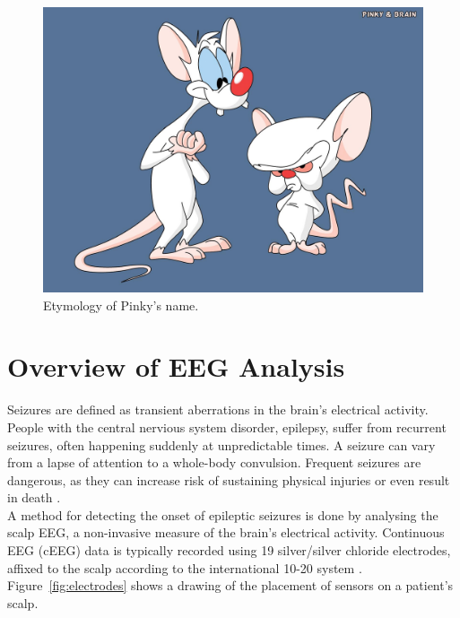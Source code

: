 \begin{figure}[h]
\begin{center}
\includegraphics[scale=0.5]{./img/pinky-and-the-brain.png}
\caption{Etymology of Pinky's name.}
\label{fig:pinky-and-the-brain}
\end{center}
\end{figure}

\section{Overview of EEG Analysis}

Seizures are defined as transient aberrations in the brain's electrical
activity. People with the central nervious system disorder, epilepsy, suffer
from recurrent seizures, often happening suddenly at unpredictable times.  A
seizure can vary from a lapse of attention to a whole-body convulsion.
Frequent seizures are dangerous, as they can increase risk of sustaining
physical injuries or even result in death \cite{eeg-ml}. \\

A method for detecting the onset of epileptic seizures is done by analysing the
scalp EEG, a non-invasive measure of the brain's electrical activity.
Continuous EEG (cEEG) data is typically recorded using 19 silver/silver
chloride electrodes, affixed to the scalp according to the international 10-20
system \cite{ceeg-1}. Figure~\ref{fig:electrodes} shows a drawing of the
placement of sensors on a patient's scalp. \\

